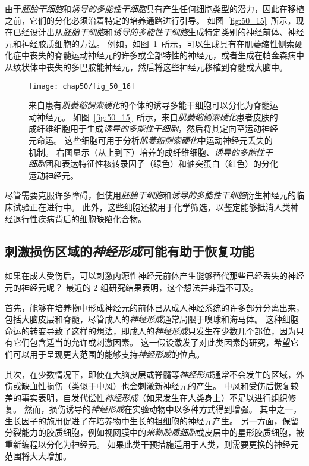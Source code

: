 由于\textit{胚胎干细胞}和\textit{诱导的多能性干细胞}具有产生任何细胞类型的潜力，因此在移植之前，它们的分化必须沿着特定的培养通路进行引导。
如图~\ref{fig:50_15}~所示，现在已经设计出从\textit{胚胎干细胞}和\textit{诱导的多能性干细胞}生成特定类别的神经前体、神经元和神经胶质细胞的方法。
例如，如图~\ref{fig:50_16}~所示，可以生成具有在肌萎缩性侧索硬化症中丧失的脊髓运动神经元的许多或全部特性的神经元，或者生成在帕金森病中从纹状体中丧失的多巴胺能神经元，然后将这些神经元移植到脊髓或大脑中。


\begin{figure}[htbp]
	\centering
	\texttt{[image: chap50/fig\_50\_16]}
	\caption{来自患有\textit{肌萎缩侧索硬化}的个体的诱导多能干细胞可以分化为脊髓运动神经元。
		如图~\ref{fig:50_15}~所示，来自\textit{肌萎缩侧索硬化}患者皮肤的成纤维细胞用于生成\textit{诱导的多能性干细胞}，然后将其定向至运动神经元命运。
		这些细胞可用于分析\textit{肌萎缩侧索硬化}中运动神经元丢失的机制。
		右图显示（从上到下）培养的成纤维细胞、\textit{诱导的多能性干细胞}团和表达特征性核转录因子（绿色）和轴突蛋白（红色）的分化运动神经元。}
	\label{fig:50_16}
\end{figure}


尽管需要克服许多障碍，但使用\textit{胚胎干细胞}和\textit{诱导的多能性干细胞}衍生神经元的临床试验正在进行中。
此外，这些细胞还被用于化学筛选，以鉴定能够抵消人类神经退行性疾病背后的细胞缺陷化合物。



\subsection{刺激损伤区域的\textit{神经形成}可能有助于恢复功能}

如果在成人受伤后，可以刺激内源性神经元前体产生能够替代那些已经丢失的神经元的神经元呢？
最近的 2 组研究结果表明，这个想法并非遥不可及。


首先，能够在培养物中形成神经元的前体已从成人神经系统的许多部分分离出来，包括大脑皮层和脊髓，尽管成人的\textit{神经形成}通常局限于嗅球和海马体。
这种细胞命运的转变导致了这样的想法，即成人的\textit{神经形成}只发生在少数几个部位，因为只有它们包含适当的允许或刺激因素。
这一假设激发了对此类因素的研究，希望它们可以用于呈现更大范围的能够支持\textit{神经形成}的位点。


其次，在少数情况下，即使在大脑皮层或脊髓等\textit{神经形成}通常不会发生的区域，外伤或缺血性损伤（类似于中风）也会刺激新神经元的产生。
中风和受伤后恢复较差的事实表明，自发代偿性\textit{神经形成}（如果发生在人类身上）不足以进行组织修复。
然而，损伤诱导的\textit{神经形成}在实验动物中以多种方式得到增强。
其中之一，生长因子的施用促进了在培养物中生长的祖细胞的神经元产生。
另一方面，保留分裂能力的胶质细胞，例如视网膜中的\textit{米勒胶质细胞}或皮层中的星形胶质细胞，被重新编程以分化为神经元。
如果此类干预措施适用于人类，则需要更换的神经元范围将大大增加。



